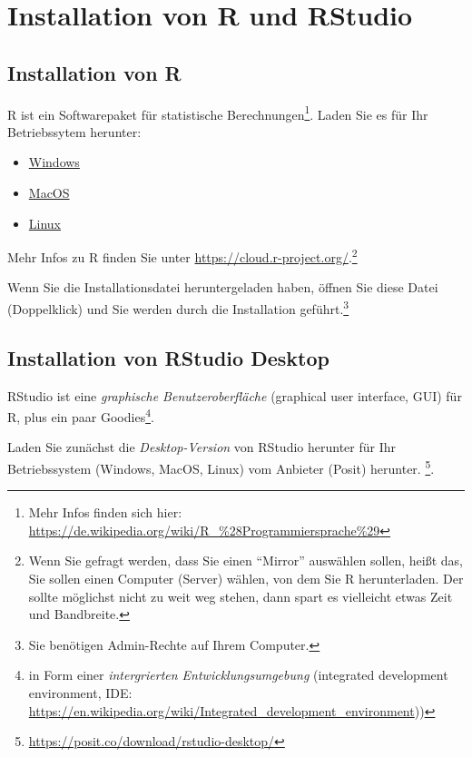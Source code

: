 \documentclass[
  a4paper,
  DIV=11]{scrreprt}
\providecommand{\tightlist}{%
  \setlength{\itemsep}{0pt}\setlength{\parskip}{0pt}}\usepackage{longtable,booktabs,array}
\theoremstyle{definition}
\theoremstyle{definition}
\theoremstyle{definition}
\theoremstyle{remark}
\begin{document}
\section{Installation von R und RStudio}\label{sec-install-r}

\subsection{Installation von R}\label{installation-von-r}

R ist ein Softwarepaket für statistische Berechnungen\footnote{Mehr
  Infos finden sich hier:
  \url{https://de.wikipedia.org/wiki/R_\%28Programmiersprache\%29}}.
Laden Sie es für Ihr Betriebssytem herunter:

\begin{itemize}
\tightlist
\item
  \href{https://cloud.r-project.org/bin/windows/base/}{Windows}
\item
  \href{https://cloud.r-project.org/bin/macosx/}{MacOS}
\item
  \href{https://cloud.r-project.org/bin/linux/}{Linux}
\end{itemize}

Mehr Infos zu R finden Sie unter
\url{https://cloud.r-project.org/}.\footnote{Wenn Sie gefragt werden,
  dass Sie einen ``Mirror'' auswählen sollen, heißt das, Sie sollen
  einen Computer (Server) wählen, von dem Sie R herunterladen. Der
  sollte möglichst nicht zu weit weg stehen, dann spart es vielleicht
  etwas Zeit und Bandbreite.}

Wenn Sie die Installationsdatei heruntergeladen haben, öffnen Sie diese
Datei (Doppelklick) und Sie werden durch die Installation
geführt.\footnote{Sie benötigen Admin-Rechte auf Ihrem Computer.}

\subsection{Installation von RStudio
Desktop}\label{installation-von-rstudio-desktop}

RStudio ist eine \emph{graphische Benutzeroberfläche} (graphical user
interface, GUI) für R, plus ein paar Goodies\footnote{in Form einer
  \emph{intergrierten Entwicklungsumgebung} (integrated development
  environment, IDE:
  \url{https://en.wikipedia.org/wiki/Integrated_development_environment}))}.

Laden Sie zunächst die \emph{Desktop-Version} von RStudio herunter für
Ihr Betriebssystem (Windows, MacOS, Linux) vom Anbieter (Posit)
herunter. \footnote{\url{https://posit.co/download/rstudio-desktop/}}.
\end{document}
